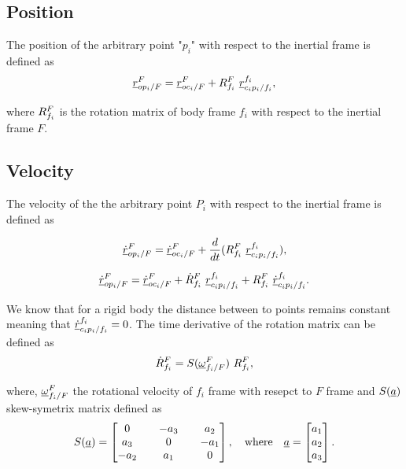 \subsection{Position}
The position of the arbitrary point "$p_{i}$" with respect to the inertial frame 
is defined as
\begin{equation}    
    \pvec{r}{op_{i}}{F}{F} = \pvec{r}{oc_{i}}{F}{F} + \rot{R}{f_{i}}{F} \  \pvec{r}{c_{i}p_{i}}{f_i}{f_i},
    \label{eq:position_rigid_body}
\end{equation}

where $\rot{R}{f_{i}}{F}$ is the rotation matrix of body frame $f_{i}$ with respect to 
the inertial frame $F$.

\subsection{Velocity}
The velocity of the the arbitrary point $P_{i}$ with respect to the inertial frame 
is defined as

\[
    \pvec{\dot{r}}{op_{i}}{F}{F} = \pvec{\dot{r}}{oc_{i}}{F}{F} + 
    \frac{d}{dt}(\rot{R}{f_{i}}{F} \  \pvec{r}{c_{i}p_{i}}{f_i}{f_i}),
\]

\begin{equation}
    \pvec{\dot{r}}{op_{i}}{F}{F} = \pvec{\dot{r}}{oc_{i}}{F}{F} + 
    \rot{\dot{R}}{f_{i}}{F} \  \pvec{r}{c_{i}p_{i}}{f_i}{f_i} + 
    \rot{R}{f_{i}}{F} \  \pvec{\dot{r}}{c_{i}p_{i}}{f_i}{f_i}.
    \label{eq:velocity_general}
\end{equation}

We know that for a rigid body the distance between to points remains constant 
meaning that $\pvec{\dot{r}}{c_{i}p_{i}}{f_i}{f_i} = 0$. The time derivative of 
the rotation matrix can be defined as 
\begin{equation}
    \rot{\dot{R}}{f_{i}}{F} = S(\pvec{\omega}{f_{i}}{F}{F}) \ \rot{R}{f_{i}}{F},
    \label{eq:rot_mat_derivative}
\end{equation}

where, $\pvec{\omega}{f_{i}}{F}{F}$ the rotational velocity of $f_{i}$ frame 
with resepct to $F$ frame and $S(\vecd{a})$ skew-symetrix matrix defined as 
\[
    S(\vecd{a}) = \begin{bmatrix}
        0 && -a_{3} && a_{2} \\
        a_{3} && 0 && -a_{1} \\ 
        -a_{2} && a_{1} && 0 \\ 
    \end{bmatrix}, \quad \text{where} \quad \vecd{a} = \begin{bmatrix}
        a_{1} \\ a_{2} \\ a_{3}
    \end{bmatrix}.
\]

